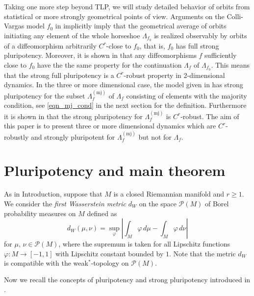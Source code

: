 \documentclass{amsart}
\theoremstyle{plain}
\theoremstyle{definition}
\theoremstyle{remark}
\numberwithin{equation}{section}
\begin{document}
Taking one more step beyond TLP, we will study detailed behavior of orbits from statistical or more strongly  geometrical points of view. 
Arguments on the Colli-Vargas model $f_0$ in \cite{CV01} implicitly imply that the geometrical average of orbits 
initiating any element of the whole horseshoe $\Lambda_{f_0}$ is realized observably by orbits of a diffeomorphism arbitrarily $C^r$-close to $f_0$, that is, 
$f_0$ has full strong pluripotency.
Moreover, it is shown in \cite{KLNSV} that any diffeomorphisms $f$ sufficiently close to 
$f_0$ have the the same property for the continuation $\Lambda_f$ of $\Lambda_{f_0}$.
This means that the strong full pluripotency is a $C^r$-robust property in 2-dimensional dynamics.
In the three or more dimensional case, the model given in \cite{KNS23} has 
strong pluripotency for the subset $\Lambda_f^{(\mathrm{mj})}$ of $\Lambda_f$ 
consisting of elements with the majority condition, 
see \eqref{eqn_mj_cond} in the next section for the definition.
Furthermore it is shown in \cite{KNS} that the strong pluripotency for $\Lambda_f^{(\mathrm{mj})}$ is $C^r$-robust.
The aim of this paper is to present three or more dimensional dynamics which are 
$C^r$-robustly and strongly pluripotent for $\Lambda_f^{(\mathrm{mj})}$ but not for $\Lambda_f$.








\section{Pluripotency and main theorem}

As in Introduction, suppose that $M$ is a closed Riemannian manifold and $r\geq 1$.
We consider the \emph{first Wasserstein metric} $d_W$ on the space $\mathcal{P}(M)$ of Borel probability measures on $M$ defined as
\[
d_W(\mu ,\nu )= \sup_\varphi \left\vert \int _M \varphi \, d\mu - \int _M \varphi \, d\nu \right\vert
\]
for $\mu$, $\nu\in \mathcal{P}(M)$, 
where the supremum is taken for all Lipschitz functions $\varphi : M \longrightarrow [-1, 1]$ 
with Lipschitz constant bounded by $1$. 
Note that the metric $d_W$ is compatible with the weak$^*$-topology on $\mathcal{P}(M)$.

Now we recall the concepts of pluripotency and strong pluripotency introduced in \cite{KNS}.
\end{document}
